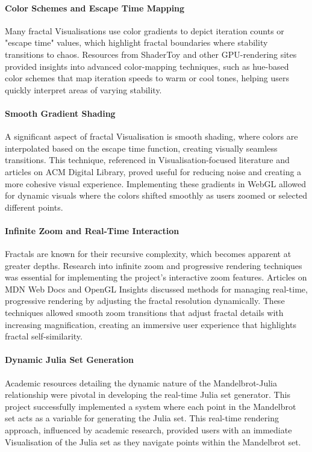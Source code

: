 \documentclass[12pt,a4paper]{report}
\begin{document}
\paragraph{Color Schemes and Escape Time Mapping}
Many fractal Visualisations use color gradients to depict iteration counts or "escape time" values, which highlight fractal boundaries where stability transitions to chaos. Resources from ShaderToy and other GPU-rendering sites provided insights into advanced color-mapping techniques, such as hue-based color schemes that map iteration speeds to warm or cool tones, helping users quickly interpret areas of varying stability. 

\paragraph{Smooth Gradient Shading}
A significant aspect of fractal Visualisation is smooth shading, where colors are interpolated based on the escape time function, creating visually seamless transitions. This technique, referenced in Visualisation-focused literature and articles on ACM Digital Library, proved useful for reducing noise and creating a more cohesive visual experience. Implementing these gradients in WebGL allowed for dynamic visuals where the colors shifted smoothly as users zoomed or selected different points. 

\paragraph{Infinite Zoom and Real-Time Interaction}
Fractals are known for their recursive complexity, which becomes apparent at greater depths. Research into infinite zoom and progressive rendering techniques was essential for implementing the project’s interactive zoom features. Articles on MDN Web Docs and OpenGL Insights discussed methods for managing real-time, progressive rendering by adjusting the fractal resolution dynamically. These techniques allowed smooth zoom transitions that adjust fractal details with increasing magnification, creating an immersive user experience that highlights fractal self-similarity. 

\paragraph{Dynamic Julia Set Generation}
Academic resources detailing the dynamic nature of the Mandelbrot-Julia relationship were pivotal in developing the real-time Julia set generator. This project successfully implemented a system where each point in the Mandelbrot set acts as a variable for generating the Julia set. This real-time rendering approach, influenced by academic research, provided users with an immediate Visualisation of the Julia set as they navigate points within the Mandelbrot set.
\end{document}
